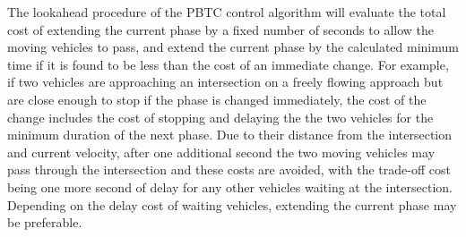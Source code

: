 The lookahead procedure of the PBTC control algorithm will evaluate the total cost of extending the current phase by a fixed number of seconds to allow the moving vehicles to pass, and extend the current phase by the calculated minimum time if it is found to be less than the cost of an immediate change. For example, if two vehicles are approaching an intersection on a freely flowing approach but are close enough to stop if the phase is changed immediately, the cost of the change includes the cost of stopping and delaying the the two vehicles for the minimum duration of the next phase. Due to their distance from the intersection and current velocity, after one additional second the two moving vehicles may pass through the intersection and these costs are avoided, with the trade-off cost being one more second of delay for any other vehicles waiting at the intersection. Depending on the delay cost of waiting vehicles, extending the current phase may be preferable. 




